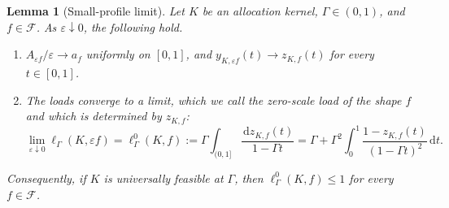 \documentclass[11pt]{article}
\newtheorem{lemma}[theorem]{Lemma}
\theoremstyle{definition}
\theoremstyle{remark}
\newcommand{\dd}{\,\mathrm d}
\begin{document}
\begin{lemma}[Small-profile limit]\label{lem:rare-limit}
Let $K$ be an allocation kernel, $\Gamma\in(0,1)$, and $f\in\mathcal F$.
As $\varepsilon\downarrow0$, the following hold.
\begin{enumerate}
\item[(a)] $A_{\varepsilon f}/\varepsilon\to a_f$ uniformly on $[0,1]$, and $y_{K,\varepsilon f}(t)\to z_{K,f}(t)$ for every $t\in[0,1]$.
\item[(b)] The loads converge to a limit, which we call the \emph{zero-scale load} of the shape $f$ and which is determined by
$z_{K,f}$:
\begin{equation}\label{eq:rare-load}
 \lim_{\varepsilon\downarrow0}\ell_\Gamma(K,\varepsilon f)
 =\ell^{0}_\Gamma(K,f)
 :=\Gamma\int_{(0,1]}
       \frac{\dd z_{K,f}(t)}{1-\Gamma t}
 =\Gamma+\Gamma^2\int_0^1
       \frac{1-z_{K,f}(t)}{(1-\Gamma t)^2}\dd t.
\end{equation}
\end{enumerate}
Consequently, if $K$ is universally feasible at $\Gamma$, then $\ell^{0}_\Gamma(K,f)\le1$ for every $f\in\mathcal F$.
\end{lemma}
\end{document}

